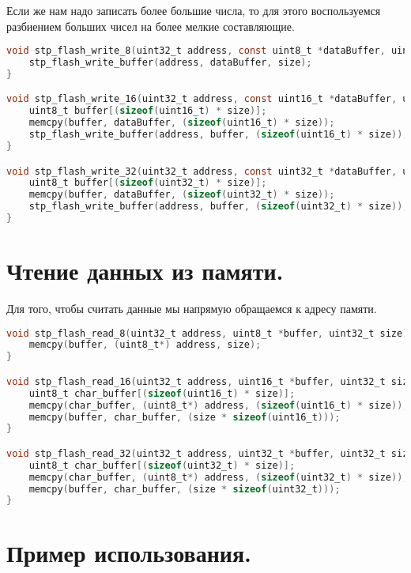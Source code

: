 \documentclass{bmstu}
\begin{document}
	Если же нам надо записать более большие числа, то для этого воспользуемся разбиением больших чисел на более мелкие составляющие.
	
	\begingroup
	\fontsize{12pt}{12pt}\selectfont
	\begin{lstlisting}[language=C]
void stp_flash_write_8(uint32_t address, const uint8_t *dataBuffer, uint32_t size) {
	stp_flash_write_buffer(address, dataBuffer, size);
}

void stp_flash_write_16(uint32_t address, const uint16_t *dataBuffer, uint32_t size) {
	uint8_t buffer[(sizeof(uint16_t) * size)];
	memcpy(buffer, dataBuffer, (sizeof(uint16_t) * size));
	stp_flash_write_buffer(address, buffer, (sizeof(uint16_t) * size));
}

void stp_flash_write_32(uint32_t address, const uint32_t *dataBuffer, uint32_t size) {
	uint8_t buffer[(sizeof(uint32_t) * size)];
	memcpy(buffer, dataBuffer, (sizeof(uint32_t) * size));
	stp_flash_write_buffer(address, buffer, (sizeof(uint32_t) * size));
}
	\end{lstlisting}
	\endgroup
	
	\section{Чтение данных из памяти.}
	
	Для того, чтобы считать данные мы напрямую обращаемся к адресу памяти.
	
	\begingroup
	\fontsize{12pt}{12pt}\selectfont
	\begin{lstlisting}[language=C]
void stp_flash_read_8(uint32_t address, uint8_t *buffer, uint32_t size) {
	memcpy(buffer, (uint8_t*) address, size);
}

void stp_flash_read_16(uint32_t address, uint16_t *buffer, uint32_t size) {
	uint8_t char_buffer[(sizeof(uint16_t) * size)];
	memcpy(char_buffer, (uint8_t*) address, (sizeof(uint16_t) * size));
	memcpy(buffer, char_buffer, (size * sizeof(uint16_t)));
}

void stp_flash_read_32(uint32_t address, uint32_t *buffer, uint32_t size) {
	uint8_t char_buffer[(sizeof(uint32_t) * size)];
	memcpy(char_buffer, (uint8_t*) address, (sizeof(uint32_t) * size));
	memcpy(buffer, char_buffer, (size * sizeof(uint32_t)));
}
	\end{lstlisting}
	\endgroup
	
	\section{Пример использования.}
	
\end{document}
